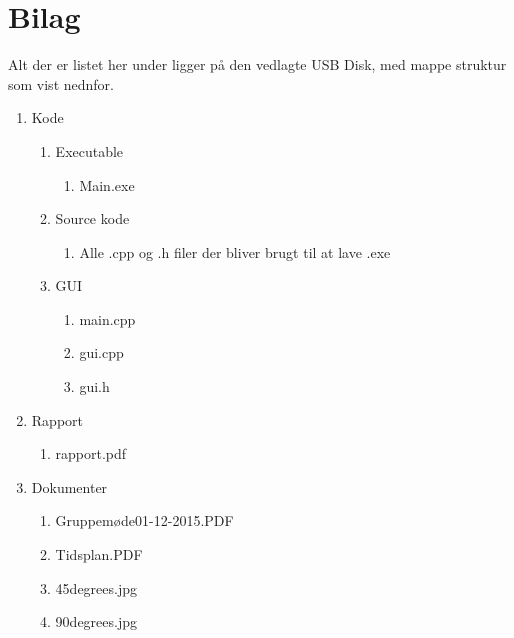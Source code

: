 \appendix
\section{Bilag} \hfill
Alt der er listet her under ligger på den vedlagte USB Disk, med mappe struktur som vist nednfor.
\label{sec:bilag}
\begin{enumerate}[noitemsep]
	\item Kode
	\begin{enumerate}[noitemsep]
		\item Executable
		\begin{enumerate}[noitemsep]
			\item Main.exe
		\end{enumerate}
		\item Source kode
		\begin{enumerate}[noitemsep]
			\item Alle .cpp og .h filer der bliver brugt til at lave .exe
		\end{enumerate}
		\item GUI
		\begin{enumerate}[noitemsep]
			\item main.cpp
			\item gui.cpp
			\item gui.h
		\end{enumerate}
	\end{enumerate}
	\item Rapport
	\begin{enumerate}[noitemsep]
		\item rapport.pdf
	\end{enumerate}
	\item Dokumenter
	\begin{enumerate}[noitemsep]
		\item Gruppemøde01-12-2015.PDF \label{itm:Modereferat1}
		\item Tidsplan.PDF \label{itm:Tidsplan1}
		\item 45degrees.jpg \label{itm:45deg}
		\item 90degrees.jpg \label{itm:90deg}
	\end{enumerate}
\end{enumerate}